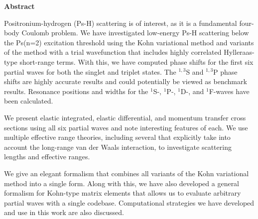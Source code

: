 
\thispagestyle{plain}
\begin{center}
    \large
    \textbf{Abstract}
\end{center}

Positronium-hydrogen (Ps-H) scattering is of interest, as it is a fundamental 
four-body Coulomb problem. We have investigated low-energy Ps-H scattering 
below the Ps(n=2) excitation threshold using the Kohn variational method and 
variants of the method with a trial wavefunction that includes highly 
correlated Hylleraas-type short-range terms. With this, we have computed 
phase shifts for the first six partial waves for both the singlet and triplet 
states. The $^{1,3}$S and $^{1,3}$P phase shifts are highly accurate results
and could potentially be viewed as benchmark results.
Resonance positions and widths for the $^1$S-, $^1$P-, $^1$D-, and
$^1$F-waves have been calculated.

We present elastic integrated, elastic differential, and momentum transfer 
cross sections using all six partial waves and note interesting features of 
each. We use multiple effective range theories, including several that 
explicitly take into account the long-range van der Waals interaction, to 
investigate scattering lengths and effective ranges.

We give an elegant formalism that combines all variants of the Kohn variational
method into a single form. Along with this, we have also developed a general
formalism for Kohn-type matrix elements that allows us to evaluate arbitrary 
partial waves with a single codebase. Computational strategies we have 
developed and use in this work are also discussed. %
